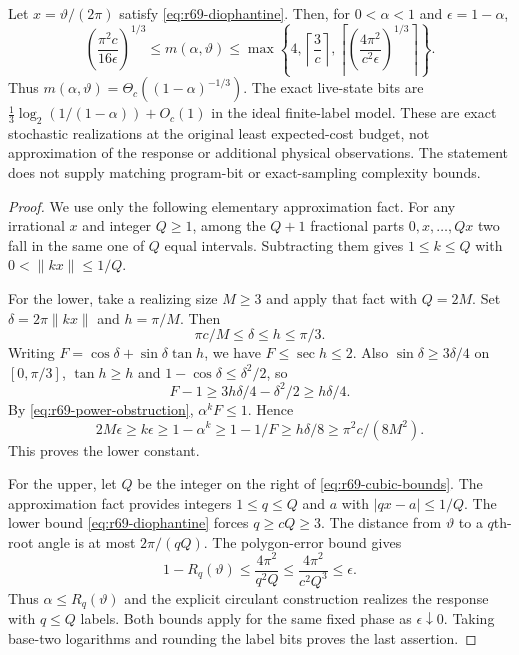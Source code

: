 \begin{theorem}\label{thm:r69-cubic}
Let $x=\vartheta/(2\pi)$ satisfy \eqref{eq:r69-diophantine}. Then, for $0<\alpha<1$ and $\epsilon=1-\alpha$,
\begin{equation}\label{eq:r69-cubic-bounds}
 \left(\frac{\pi^2c}{16\epsilon}\right)^{1/3}
 \le m(\alpha,\vartheta)
 \le \max\left\{4,\left\lceil\frac3c\right\rceil,
              \left\lceil\left(\frac{4\pi^2}{c^2\epsilon}\right)^{1/3}\right\rceil\right\}.
\end{equation}
Thus $m(\alpha,\vartheta)=\Theta_c((1-\alpha)^{-1/3})$. The exact live-state bits are $\frac13\log_2(1/(1-\alpha))+O_c(1)$ in the ideal finite-label model. These are exact stochastic realizations at the original least expected-cost budget, not approximation of the response or additional physical observations. The statement does not supply matching program-bit or exact-sampling complexity bounds.
\end{theorem}
\begin{proof}
We use only the following elementary approximation fact. For any irrational $x$ and integer $Q\ge1$, among the $Q+1$ fractional parts $0,x,\ldots,Qx$ two fall in the same one of $Q$ equal intervals. Subtracting them gives $1\le k\le Q$ with $0<\|kx\|\le1/Q$.

For the lower, take a realizing size $M\ge3$ and apply that fact with $Q=2M$. Set $\delta=2\pi\|kx\|$ and $h=\pi/M$. Then
\[
 \pi c/M\le\delta\le h\le\pi/3.
\]
Writing $F=\cos\delta+\sin\delta\tan h$, we have $F\le\sec h\le2$. Also $\sin\delta\ge3\delta/4$ on $[0,\pi/3]$, $\tan h\ge h$ and $1-\cos\delta\le\delta^2/2$, so
\[
 F-1\ge3h\delta/4-\delta^2/2\ge h\delta/4.
\]
By \eqref{eq:r69-power-obstruction}, $\alpha^kF\le1$. Hence
\[
 2M\epsilon\ge k\epsilon\ge1-\alpha^k
       \ge1-1/F\ge h\delta/8
       \ge\pi^2c/(8M^2).
\]
This proves the lower constant.

For the upper, let $Q$ be the integer on the right of \eqref{eq:r69-cubic-bounds}. The approximation fact provides integers $1\le q\le Q$ and $a$ with $|qx-a|\le1/Q$. The lower bound \eqref{eq:r69-diophantine} forces $q\ge cQ\ge3$. The distance from $\vartheta$ to a $q$th-root angle is at most $2\pi/(qQ)$. The polygon-error bound gives
\[
 1-R_q(\vartheta)\le\frac{4\pi^2}{q^2Q}
       \le\frac{4\pi^2}{c^2Q^3}\le\epsilon.
\]
Thus $\alpha\le R_q(\vartheta)$ and the explicit circulant construction realizes the response with $q\le Q$ labels. Both bounds apply for the same fixed phase as $\epsilon\downarrow0$. Taking base-two logarithms and rounding the label bits proves the last assertion.
\end{proof}

